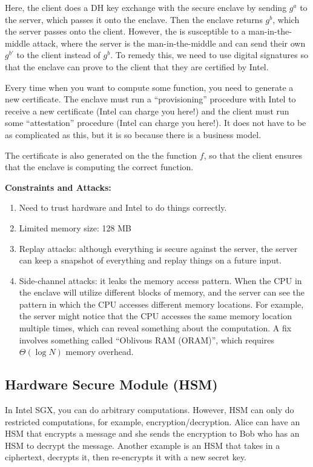 Here, the client does a DH key exchange with the secure enclave by sending $g^a$ to the server, which passes it onto the enclave. Then the enclave returns $g^b$, which the server passes onto the client. However, the is susceptible to a man-in-the-middle attack, where the server is the man-in-the-middle and can send their own $g^{b'}$ to the client instead of $g^b$. To remedy this, we need to use digital signatures so that the enclave can prove to the client that they are certified by Intel.

Every time when you want to compute some function, you need to generate a new certificate. The enclave must run a ``provisioning'' procedure with Intel to receive a new certificate (Intel can charge you here!) and the client must run some ``attestation'' procedure (Intel can charge you here!). It does not have to be as complicated as this, but it is so because there is a business model.

The certificate is also generated on the the function $f$, so that the client ensures that the enclave is computing the correct function.

\textbf{Constraints and Attacks:}

\begin{enumerate}
    \item Need to trust hardware and Intel to do things correctly.
    \item Limited memory size: 128 MB
    \item Replay attacks: although everything is secure against the server, the server can keep a snapshot of everything and replay things on a future input.
    \item Side-channel attacks: it leaks the memory access pattern. When the CPU in the enclave will utilize different blocks of memory, and the server can see the pattern in which the CPU accesses different memory locations. For example, the server might notice that the CPU accesses the same memory location multiple times, which can reveal something about the computation. A fix involves something called ``Oblivous RAM (ORAM)'', which requires $\Theta (\log N)$ memory overhead.
\end{enumerate}

\subsection{Hardware Secure Module (HSM)}

In Intel SGX, you can do arbitrary computations. However, HSM can only do restricted computations, for example, encryption/decryption. Alice can have an HSM that encrypts a message and she sends the encryption to Bob who has an HSM to decrypt the message. Another example is an HSM that takes in a ciphertext, decrypts it, then re-encrypts it with a new secret key.

